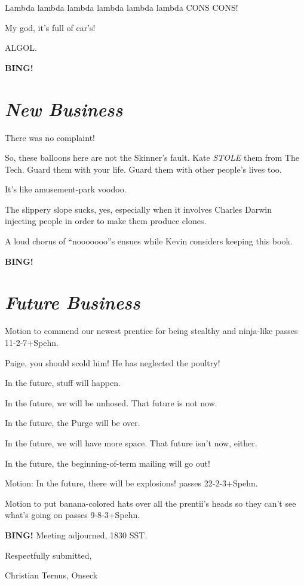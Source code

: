 \documentclass[10pt]{article}
\newcommand{\bing}{{\bf BING!} }
\newcommand{\goto}[1]{\bing \vskip 12pt \section*{{\em{#1}}}}
\begin{document}
Lambda lambda lambda lambda lambda lambda CONS CONS!

My god, it's full of car's!

ALGOL.

\goto{New Business}

There was no complaint!

So, these balloons here are not the Skinner's fault.  Kate \emph{STOLE} them from The Tech.  Guard
them with your life.  Guard them with other people's lives too.

It's like amusement-park voodoo.

The slippery slope sucks, yes, especially when it involves Charles Darwin injecting people in order
to make them produce clones.

A loud chorus of ``nooooooo''s ensues while Kevin considers keeping this book.

\goto{Future Business}

Motion to commend our newest prentice for being stealthy and ninja-like passes 11-2-7+Spehn.

Paige, you should scold him!  He has neglected the poultry!

In the future, stuff will happen.

In the future, we will be unhosed.  That future is not now.

In the future, the Purge will be over.

In the future, we will have more space.  That future isn't now, either.

In the future, the beginning-of-term mailing will go out!

Motion: In the future, there will be explosions! passes 22-2-3+Spehn.

Motion to put banana-colored hats over all the prentii's heads so they can't see what's going on passes 9-8-3+Spehn.

\bing
\noindent
Meeting adjourned, 1830 SST.

\vspace{18pt}

\centerline{Respectfully submitted,}
\centerline{Christian Ternus, Onseck}
\end{document}
